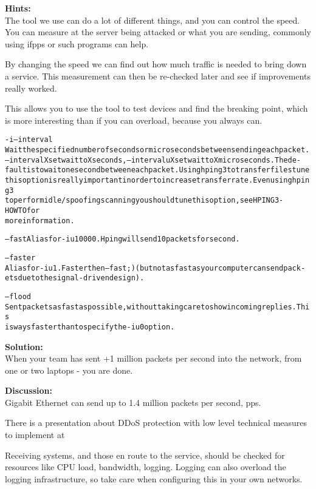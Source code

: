 \documentclass[a4paper,11pt,notitlepage]{report}
\begin{document}
{\bf Hints:}\\
The tool we use can do a lot of different things, and you can control the speed. You can measure at the server being attacked or what you are sending, commonly using ifpps or such programs can help.

By changing the speed we can find out how much traffic is needed to bring down a service. This measurement can then be re-checked later and see if improvements really worked.

This allows you to use the tool to test devices and find the breaking point, which is more interesting than if you can overload, because you always can.
\begin{alltt}\footnotesize
-i --interval
       Wait  the  specified  number  of  seconds or micro seconds between sending each packet.
       --interval X set wait to X seconds, --interval uX set wait to X micro seconds.  The de‐
       fault  is  to  wait one second between each packet. Using hping3 to transfer files tune
       this option is really important in order to increase transfer rate. Even  using  hping3
       to  perform  idle/spoofing  scanning  you should tune this option, see HPING3-HOWTO for
       more information.

--fast Alias for -i u10000. Hping will send 10 packets for second.

--faster
       Alias for -i u1. Faster then --fast ;) (but not as fast as your computer can send pack‐
       ets due to the signal-driven design).

--flood
       Sent  packets  as fast as possible, without taking care to show incoming replies.  This
       is ways faster than to specify the -i u0 option.
\end{alltt}

{\bf Solution:}\\
When your team has sent +1 million packets per second into the network, from one or two laptops - you are done.

{\bf Discussion:}\\
Gigabit Ethernet can send up to 1.4 million packets per second, pps.

There is a presentation about DDoS protection with low level technical measures to implement at\\
{\footnotesize {}}

Receiving systems, and those en route to the service, should be checked for resources like CPU load, bandwidth, logging. Logging can also overload the logging infrastructure, so take care when configuring this in your own networks.
\end{document}
